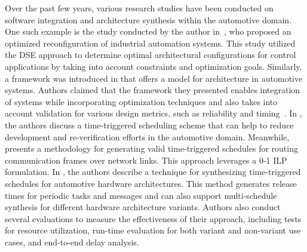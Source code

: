 Over the past few years, various research studies have been conducted on software integration and architecture synthesis within the automotive domain. One such example is the study conducted by the author in~\cite{terzimehic2018optimization}, who proposed an optimized reconfiguration of industrial automation systems. This study utilized the DSE approach to determine optimal architectural configurations for control applications by taking into account constraints and optimization goals.
Similarly, a framework was introduced in \cite{zheng2016next} that offers a model for architecture in automotive systems. Authors claimed that the framework they presented enables integration of systems while incorporating optimization techniques and also takes into account validation for various design metrics, such as reliability and timing~\cite{askaripoor2022architecture}.
In \cite{zheng2005extensible}, the authors discuss a time-triggered scheduling scheme that can help to reduce development and re-verification efforts in the automotive domain. Meanwhile, \cite{smirnov2017optimizing} presents a methodology for generating valid time-triggered schedules for routing communication frames over network links. This approach leverages a 0-1 ILP formulation.
In \cite{sagstetter2015multischedule}, the authors describe a technique for synthesizing time-triggered schedules for automotive hardware architectures. This method generates release times for periodic tasks and messages and can also support multi-schedule synthesis for different hardware architecture variants. Authors also conduct several evaluations to measure the effectiveness of their approach, including tests for resource utilization, run-time evaluation for both variant and non-variant use cases, and end-to-end delay analysis.


